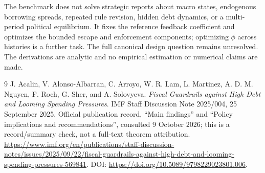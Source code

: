 \documentclass[11pt]{article}
\theoremstyle{remark}
\begin{document}
The benchmark does not solve strategic reports about macro states,
endogenous borrowing spreads, repeated rule revision, hidden debt dynamics,
or a multi-period political equilibrium. It fixes the reference feedback
coefficient and optimizes the bounded escape and enforcement components;
optimizing $\phi$ across histories is a further task. The full canonical
design question remains unresolved. The derivations are analytic and no
empirical estimation or numerical claims are made.

\begin{thebibliography}{9}
 J. Acalin, V. Alonso-Albarran, C. Arroyo,
W. R. Lam, L. Martinez, A. D. M. Nguyen, F. Roch, G. Sher,
and A. Solovyeva. \emph{Fiscal Guardrails against High Debt and Looming
Spending Pressures}. IMF Staff Discussion Note 2025/004,
25 September 2025. Official publication record, ``Main findings'' and
``Policy implications and recommendations'', consulted 9 October 2026;
this is a record/summary check, not a full-text theorem attribution.
\url{https://www.imf.org/en/publications/staff-discussion-notes/issues/2025/09/22/fiscal-guardrails-against-high-debt-and-looming-spending-pressures-569841}.
DOI: \url{https://doi.org/10.5089/9798229023801.006}.
\end{thebibliography}
\end{document}
